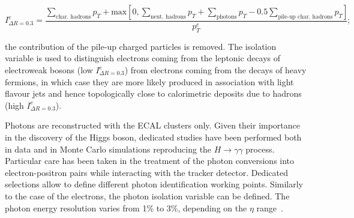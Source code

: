 \begin{equation}
I_{\Delta R = 0.3}^e = \frac{\sum_{\text{char. hadrons}} p_T + \text{max} \left[ 0, \sum_{\text{neut. hadrons}} p_T + \sum_{\text{photons}} p_T - 0.5 \sum_{\text{pile-up char. hadrons}} p_T\right]}{p_T^e};
\label{eq:electron_iso}
\end{equation}

\noindent the contribution of the pile-up charged particles is removed. The isolation variable is used to distinguish electrons coming from the leptonic decays of electroweak bosons (low $I_{\Delta R = 0.3}^e$) from electrons coming from the decays of heavy fermions, in which case they are more likely produced in association with light flavour jets and hence topologically close to calorimetric deposits due to hadrons (high $I_{\Delta R = 0.3}^e$).

\vspace*{1\baselineskip}

\noindent Photons are reconstructed with the ECAL clusters only. Given their importance in the discovery of the Higgs boson, dedicated studies have been performed both in data and in Monte Carlo simulations reproducing the $H \rightarrow \gamma \gamma$ process. Particular care has been taken in the treatment of the photon conversions into electron-positron pairs while interacting with the tracker detector. Dedicated selections allow to define different photon identification working points. Similarly to the case of the electrons, the photon isolation variable can be defined. The photon energy resolution varies from 1\% to 3\%, depending on the $\eta$ range~\cite{Khachatryan:2015iwa}.


